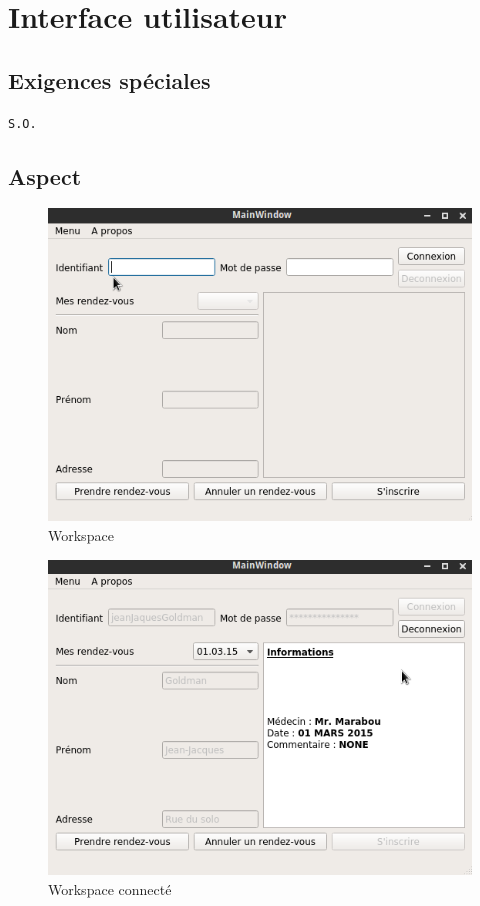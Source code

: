 \documentclass[a4paper, 11pt]{report}
\begin{document}
\section{Interface utilisateur}
\subsection{Exigences spéciales}
\texttt{S.O.}
\subsection{Aspect}
\begin{figure}[hb]
	\centering
	\includegraphics[scale=0.4]{GUI/workspace.png}
	\caption{Workspace}
	\label{fig:workspace}
\end{figure}
\begin{figure}[hb]
	\centering
	\includegraphics[scale=0.4]{GUI/connected.png}
	\caption{Workspace connecté}
	\label{fig:wrkconnected}
\end{figure}
\end{document}
